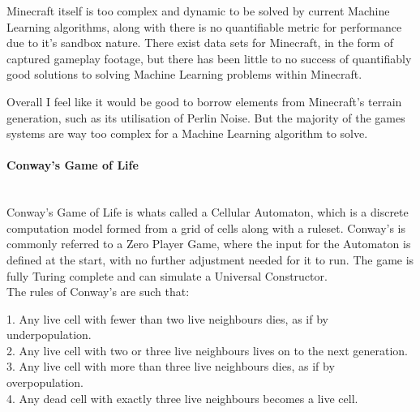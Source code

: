 \begin{flushleft}
                        Minecraft itself is too complex and dynamic to be solved by current Machine Learning algorithms, along with there is no quantifiable 
                        metric for performance due to it's sandbox nature. There exist data sets for Minecraft, in the form of captured gameplay footage, but
                        there has been little to no success of quantifiably good solutions to solving Machine Learning problems within Minecraft. \\

                        \vspace{0.2cm}

                        Overall I feel like it would be good to borrow elements from Minecraft's terrain generation, such as its utilisation of Perlin Noise.
                        But the majority of the games systems are way too complex for a Machine Learning algorithm to solve. \\

                    \vspace{1cm}
                    \paragraph{Conway's Game of Life} \mbox{} \\
                        \vspace{0.2cm}
                        Conway's Game of Life is whats called a Cellular Automaton, which is a discrete computation model formed from a grid of cells along with 
                        a ruleset. Conway's is commonly referred to a Zero Player Game, where the input for the Automaton is defined at the start, with no
                        further adjustment needed for it to run. The game is fully Turing complete and can simulate a Universal Constructor. \\
                        \vspace{0.2cm}
                        The rules of Conway's are such that: \\

                        
                        \begin{center}
                            \normalsize
                            1. Any live cell with fewer than two live neighbours dies, as if by underpopulation. \\
                            2. Any live cell with two or three live neighbours lives on to the next generation. \\
                            3. Any live cell with more than three live neighbours dies, as if by overpopulation. \\
                            4. Any dead cell with exactly three live neighbours becomes a live cell. \\
                        \end{center}


\end{flushleft}

